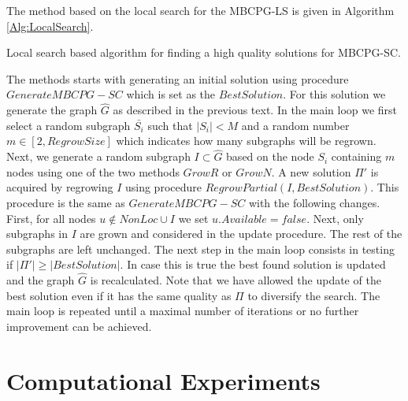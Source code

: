 The method based on the local search  for the MBCPG-LS is given in Algorithm \ref{Alg:LocalSearch}.
\begin{algorithm}
\begin{algorithmic}
	\EndIf
\EndWhile
\end{algorithmic}
\caption{\label{Alg:LocalSearch} Local search based algorithm for finding a high quality solutions for MBCPG-SC.}
\end{algorithm}
The methods starts with generating an initial solution using procedure $GenerateMBCPG-SC$ which is set as the $Best Solution$. For this solution we generate the graph $\hat{G}$ as described in the previous text. In the main loop we first select a random subgraph $\bar{S_i}$ such that $|S_i|<M$ and a random number $m \in [2, RegrowSize] $ which indicates how many subgraphs  will be regrown. Next, we generate a random  subgraph  $I \subset \hat{G}$ based on the node $S_i$ containing $m$ nodes  using one of the two methods $GrowR$ or $GrowN$. A new solution $\Pi'$ is acquired by regrowing $I$ using procedure $RegrowPartial(I,BestSolution)$. This procedure is the same as $GenerateMBCPG-SC$ with the following changes. First, for all nodes  $u \notin NonLoc \cup I$ we set $u.Available = false$. Next, only subgraphs in $I$ are grown and considered in the update procedure. The rest of the subgraphs are left unchanged. 
The next step in the main loop consists in  testing if $|\Pi'| \geq |BestSolution|$. In case this is true the best found solution is updated and the graph $\hat{G}$ is recalculated. Note that we have allowed the update of the best solution even if it has the same quality as $\Pi$ to diversify the search. The main loop is repeated until a maximal number of iterations or no further improvement can be achieved. 


\section{Computational Experiments}

